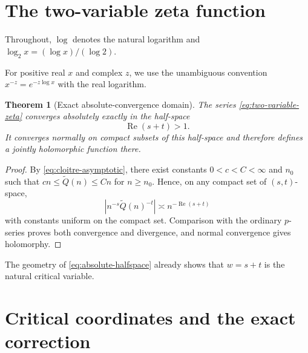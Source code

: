 \documentclass[11pt]{article}
\newtheorem{theorem}{Theorem}[section]
\theoremstyle{definition}
\theoremstyle{remark}
\newcommand{\Qp}{\widetilde Q}
\newcommand{\RePart}{\operatorname{Re}}
\begin{document}
\section{The two-variable zeta function}

Throughout, \(\log\) denotes the natural logarithm and
\(\log_2x=(\log x)/(\log2)\).

For positive real \(x\) and complex \(z\), we use the unambiguous convention
\(x^{-z}=e^{-z\log x}\) with the real logarithm.

\begin{theorem}[Exact absolute-convergence domain]
\label{thm:absolute-domain}
The series \eqref{eq:two-variable-zeta} converges absolutely exactly in the half-space
\begin{equation}
\boxed{\RePart(s+t)>1.}
\label{eq:absolute-halfspace}
\end{equation}
It converges normally on compact subsets of this half-space and therefore defines a jointly holomorphic function there.
\end{theorem}

\begin{proof}
By \eqref{eq:cloitre-asymptotic}, there exist constants \(0<c<C<\infty\) and \(n_0\) such that
\(cn\le\Qp(n)\le Cn\) for \(n\ge n_0\).  Hence, on any compact set of \((s,t)\)-space,
\[
\left|n^{-s}\Qp(n)^{-t}\right|
\asymp n^{-\RePart(s+t)}
\]
with constants uniform on the compact set.  Comparison with the ordinary \(p\)-series proves both convergence and divergence, and normal convergence gives holomorphy.
\end{proof}

The geometry of \eqref{eq:absolute-halfspace} already shows that \(w=s+t\) is the natural critical variable.

\section{Critical coordinates and the exact correction}
\end{document}

